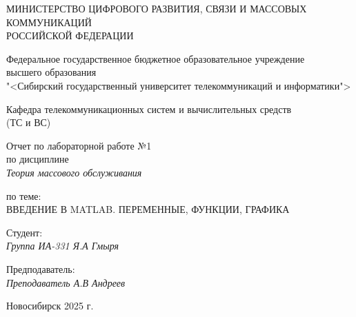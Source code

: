 \thispagestyle{empty}

\begin{center}
    МИНИСТЕРСТВО ЦИФРОВОГО РАЗВИТИЯ, СВЯЗИ И МАССОВЫХ КОММУНИКАЦИЙ \\ РОССИЙСКОЙ ФЕДЕРАЦИИ

    \vspace{20pt}

    Федеральное государственное бюджетное образовательное учреждение  \\  высшего образования \\
    "<Сибирский государственный университет телекоммуникаций и информатики"> \\

    \vspace{20pt}

    Кафедра телекоммуникационных систем и вычислительных средств \\  (ТС и ВС)
\end{center}

\vfill

\begin{center}
    Отчет по лабораторной работе №1 \\  
    по дисциплине \\
    \textit{Теория массового обслуживания}

    \vspace{20pt}

    по теме: \\
    \uppercase{Введение в MATLAB. Переменные, функции, графика}
\end{center}

\vfill

    \noindent Студент: \\
    \textit{Группа ИА-331 \hfill Я.А Гмыря}

    \vspace{20pt}

    \noindent Предподаватель: \\
    \textit{Преподаватель \hfill А.В Андреев}

\vfill

\begin{center}
    Новосибирск 2025 г.
\end{center}